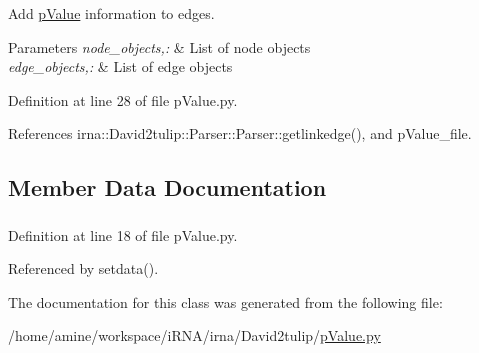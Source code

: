 \-Add \hyperlink{classirna_1_1David2tulip_1_1pValue_1_1pValue}{p\-Value} information to edges. 


\begin{DoxyParams}{\-Parameters}
{\em node\-\_\-objects,\-:} & \-List of node objects \\
\hline
{\em edge\-\_\-objects,\-:} & \-List of edge objects \\
\hline
\end{DoxyParams}


\-Definition at line 28 of file p\-Value.\-py.



\-References irna\-::\-David2tulip\-::\-Parser\-::\-Parser\-::getlinkedge(), and p\-Value\-\_\-file.



\subsection{\-Member \-Data \-Documentation}
\hypertarget{classirna_1_1David2tulip_1_1pValue_1_1pValue_a3becbaf9339896fcb5a0b9caeaa6d06e}{
\subsubsection[{p\-Value\-\_\-file}]{}}
\label{classirna_1_1David2tulip_1_1pValue_1_1pValue_a3becbaf9339896fcb5a0b9caeaa6d06e}


\-Definition at line 18 of file p\-Value.\-py.



\-Referenced by setdata().



\-The documentation for this class was generated from the following file\-:\begin{DoxyCompactItemize}
\item 
/home/amine/workspace/i\-R\-N\-A/irna/\-David2tulip/\hyperlink{David2tulip_2pValue_8py}{p\-Value.\-py}\end{DoxyCompactItemize}
